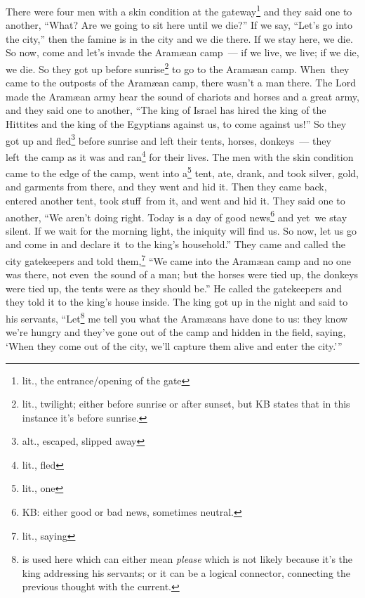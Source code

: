 \begin{inparaenum}
     There were four men with a skin condition at the gateway\footnote{lit., the entrance/opening of the gate} and they said one to another, ``What? Are we going to sit here until we die?''%
     If we say, ``Let's go into the city,'' then the famine is in the city and we die there. If we stay here, we die. So now, come and let's invade the Aram\ae{}an camp~--- if we live, we live; if we die, we die.%
     So they got up before sunrise\footnote{lit., twilight; either before sunrise or after sunset, but KB states that in this instance it's before sunrise.} to go to the Aram\ae{}an camp. When\understood\ they came to the outposts of the Aram\ae{}an camp, there wasn't a man there.%
     The Lord made the Aram\ae{}an army hear the sound of chariots and horses and a great army, and they said one to another, ``The king of Israel has hired the king of the Hittites and the king of the Egyptians against us, to come against us!''%
     So they got up and fled\footnote{alt., escaped, slipped away} before sunrise and left their tents, horses, donkeys~--- they left\understood\ the camp as it was and ran\footnote{lit., fled} for their lives.%
     The men with the skin condition came to the edge of the camp, went into a\footnote{lit., one} tent, ate, drank, and took silver, gold, and garments from there, and they went and hid it. Then they came back, entered another tent, took stuff\understood\ from it, and went and hid it.%
     They said one to another, ``We aren't doing right. Today is a day of good news\footnote{KB: either good or bad news, sometimes neutral.} and yet\understood\ we stay silent. If we wait for the morning light, the iniquity will find us. So now, let us go and come in and declare it\understood\ to the king's household.''%
     They came and called the city gatekeepers and told them,\footnote{lit., saying} ``We came into the Aram\ae{}an camp and no one was there, not even\understood\ the sound of a man; but the horses were tied up, the donkeys were tied up, the tents were as they should be.''\thinspace\understood%
     He called the gatekeepers and they told it to the king's house inside.%
     The king got up in the night and said to his servants, ``Let\footnote{ is used here which can either mean \textit{please} which is not likely because it's the king addressing his servants; or it can be a logical connector, connecting the previous thought with the current.} me tell you what the Aram\ae{}ans have done to us: they know we're hungry and they've gone out of the camp and hidden in the field, saying, `When they come out of the city, we'll capture them alive and enter the city.'\thinspace''%

\end{inparaenum}
